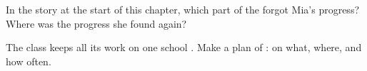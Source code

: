 \begin{exercise}[$\star\star$]\label{exo:g4:memory-and-storage:10}
In the story at the start of this chapter, which part of the  forgot
Mia's progress? Where was the progress she found again?
\end{exercise}

\begin{exercise}[$\star\star$]\label{exo:g4:memory-and-storage:11}
The class keeps all its work on one school . Make a plan of :
on what, where, and how often.
\end{exercise}
